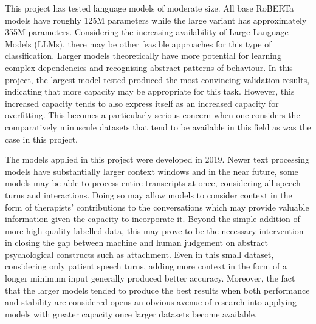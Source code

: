 \documentclass[12pt]{report}
\begin{document}
This project has tested language models of moderate size. All base RoBERTa models have roughly 125M parameters while the large variant has approximately 355M parameters.
Considering the increasing availability of Large Language Models (LLMs), there may be other feasible approaches for this type of classification.
Larger models theoretically have more potential for learning complex dependencies and recognising abstract patterns of behaviour.
In this project, the largest model tested produced the most convincing validation results, indicating that more capacity may be appropriate for this task.
However, this increased capacity tends to also express itself as an increased capacity for overfitting.
This becomes a particularly serious concern when one considers the comparatively minuscule datasets that tend to be available in this field as was the case in this project.

The models applied in this project were developed in 2019.
Newer text processing models have substantially larger context windows and in the near future, some models may be able to process entire transcripts at once, considering all speech turns and interactions.
Doing so may allow models to consider context in the form of therapists' contributions to the conversations which may provide valuable information given the capacity to incorporate it.
Beyond the simple addition of more high-quality labelled data, this may prove to be the necessary intervention in closing the gap between machine and human judgement on abstract psychological constructs such as attachment.
Even in this small dataset, considering only patient speech turns, adding more context in the form of a longer minimum input generally produced better accuracy.
Moreover, the fact that the larger models tended to produce the best results when both performance and stability are considered opens an obvious avenue of research into applying models with greater capacity once larger datasets become available.
\end{document}
